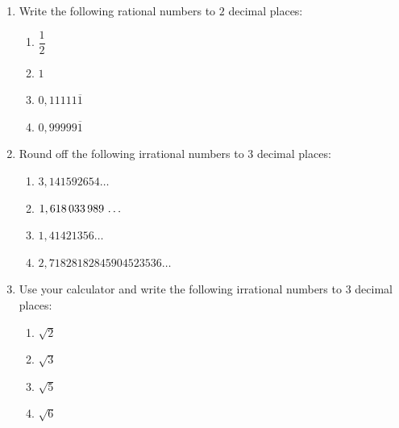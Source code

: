 \begin{eocexercises}{}
\begin{enumerate}[itemsep=5pt, label=\textbf{\arabic*}. ]


\item Write the following rational numbers to $2$ decimal places:
    \begin{enumerate}[itemsep=5pt, label=\textbf{(\alph*)} ]  
    \item $\dfrac{1}{2}$
    \item $1$
    \item $0,11111\overline{1}$
    \item $0,99999\overline{1}$
    \end{enumerate}

\item Round off the following irrational numbers to $3$ decimal places:
\begin{multicols}{2}
    \begin{enumerate}[itemsep=5pt, label=\textbf{(\alph*)} ] 
    \item $3,141592654\ldots$
    \item $1,618\phantom{\rule{0.166667em}{0ex}}033\phantom{\rule{0.166667em}{0ex}}989\phantom{\rule{0.166667em}{0ex}}\ldots$
    \item $1,41421356\ldots$
    \item $2,71828182845904523536\ldots$
    \end{enumerate}
\end{multicols}
\item Use your calculator and write the following irrational numbers to $3$ decimal places:
\begin{multicols}{2}
    \begin{enumerate}[itemsep=5pt, label=\textbf{(\alph*)} ] 
    \item $\sqrt{2}$
    \item $\sqrt{3}$
    \item $\sqrt{5}$
    \item $\sqrt{6}$
    \end{enumerate}
\end{multicols}


\end{enumerate}
\end{eocexercises}
